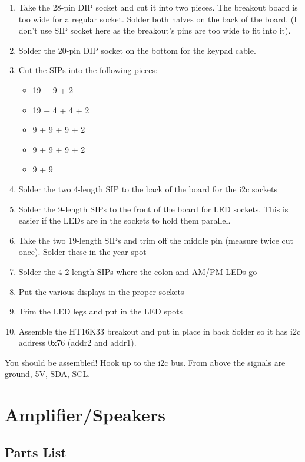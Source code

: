 \documentclass[11pt]{article}
\begin{document}
\begin{enumerate}
\item Take the 28-pin DIP socket and cut it into two pieces.
      The breakout board is too wide for a regular socket.
      Solder both halves on the back of the board.
      (I don't use SIP socket here as the breakout's pins are too
       wide to fit into it).
\item Solder the 20-pin DIP socket on the bottom for the
      keypad cable.
\item Cut the SIPs into the following pieces:
\begin{itemize}
\item 19 + 9 + 2
\item 19 + 4 + 4 + 2
\item 9 + 9 + 9 + 2
\item 9 + 9 + 9 + 2
\item 9 + 9
\end{itemize}
\item Solder the two 4-length SIP to the back of the board
      for the i2c sockets
\item Solder the 9-length SIPs to the front of the board for LED
      sockets.  This is easier if the LEDs are in the sockets to
      hold them parallel.
\item Take the two 19-length SIPs and trim off the middle pin
      (measure twice cut once).  Solder these in the year spot
\item Solder the 4 2-length SIPs where the colon and AM/PM LEDs go
\item Put the various displays in the proper sockets
\item Trim the LED legs and put in the LED spots
\item Assemble the HT16K33 breakout and put in place in back
      Solder so it has i2c address 0x76 (addr2 and addr1).
\end{enumerate}

You should be assembled!  Hook up to the i2c bus.  From above
the signals are ground, 5V, SDA, SCL.

\pagebreak
\section{Amplifier/Speakers}

\subsection{Parts List}
\end{document}
